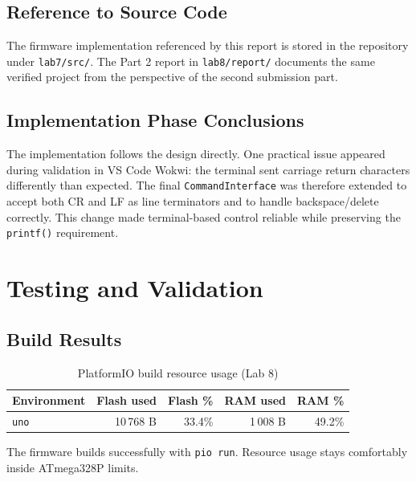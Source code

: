 \documentclass[12pt]{article}
\begin{document}
\subsection{Reference to Source Code}
The firmware implementation referenced by this report is stored in the repository under \texttt{lab7/src/}. The Part 2 report in \texttt{lab8/report/} documents the same verified project from the perspective of the second submission part.

\subsection{Implementation Phase Conclusions}
\hspace{0.8cm} The implementation follows the design directly. One practical issue appeared during validation in VS Code Wokwi: the terminal sent carriage return characters differently than expected. The final \texttt{CommandInterface} was therefore extended to accept both CR and LF as line terminators and to handle backspace/delete correctly. This change made terminal-based control reliable while preserving the \texttt{printf()} requirement.

\section{Testing and Validation}
\subsection{Build Results}
\begin{table}[H]
\centering
\begin{tabular}{lrrrr}
\toprule
\textbf{Environment} & \textbf{Flash used} & \textbf{Flash \%} & \textbf{RAM used} & \textbf{RAM \%} \\
\midrule
\texttt{uno} & 10\,768 B & 33.4\% & 1\,008 B & 49.2\% \\
\bottomrule
\end{tabular}
\caption{PlatformIO build resource usage (Lab 8)}
\label{tab:build}
\end{table}

The firmware builds successfully with \texttt{pio run}. Resource usage stays comfortably inside ATmega328P limits.
\end{document}
